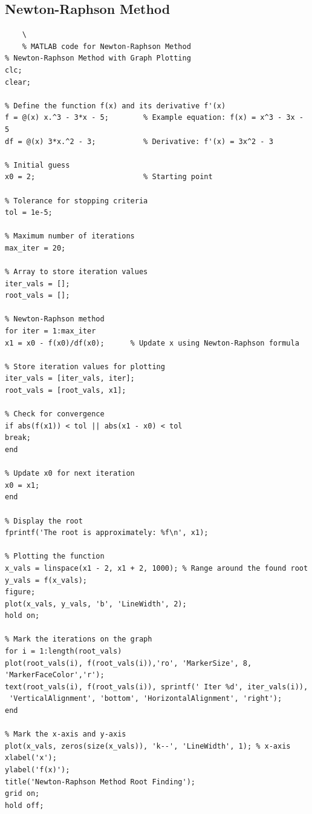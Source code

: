 \documentclass[12pt,a4paper]{article}
\begin{document}
\subsection{ Newton-Raphson Method}
\begin{verbatim}
	\
	% MATLAB code for Newton-Raphson Method
% Newton-Raphson Method with Graph Plotting
clc;
clear;

% Define the function f(x) and its derivative f'(x)
f = @(x) x.^3 - 3*x - 5;        % Example equation: f(x) = x^3 - 3x - 5
df = @(x) 3*x.^2 - 3;           % Derivative: f'(x) = 3x^2 - 3

% Initial guess
x0 = 2;                         % Starting point

% Tolerance for stopping criteria
tol = 1e-5;

% Maximum number of iterations
max_iter = 20;

% Array to store iteration values
iter_vals = [];
root_vals = [];

% Newton-Raphson method
for iter = 1:max_iter
x1 = x0 - f(x0)/df(x0);      % Update x using Newton-Raphson formula

% Store iteration values for plotting
iter_vals = [iter_vals, iter];
root_vals = [root_vals, x1];

% Check for convergence
if abs(f(x1)) < tol || abs(x1 - x0) < tol
break;
end

% Update x0 for next iteration
x0 = x1;
end

% Display the root
fprintf('The root is approximately: %f\n', x1);

% Plotting the function
x_vals = linspace(x1 - 2, x1 + 2, 1000); % Range around the found root
y_vals = f(x_vals);
figure;
plot(x_vals, y_vals, 'b', 'LineWidth', 2);
hold on;

% Mark the iterations on the graph
for i = 1:length(root_vals)
plot(root_vals(i), f(root_vals(i)),'ro', 'MarkerSize', 8, 'MarkerFaceColor','r');
text(root_vals(i), f(root_vals(i)), sprintf(' Iter %d', iter_vals(i)),
 'VerticalAlignment', 'bottom', 'HorizontalAlignment', 'right');
end

% Mark the x-axis and y-axis
plot(x_vals, zeros(size(x_vals)), 'k--', 'LineWidth', 1); % x-axis
xlabel('x');
ylabel('f(x)');
title('Newton-Raphson Method Root Finding');
grid on;
hold off;

\end{verbatim}
\end{document}
